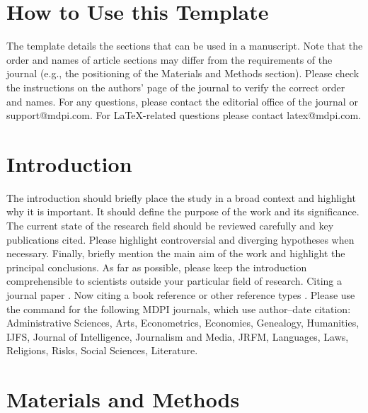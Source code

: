 \setcounter{section}{-1} %
\section{How to Use this Template}

The template details the sections that can be used in a manuscript. Note that the order and names of article sections may differ from the requirements of the journal (e.g., the positioning of the Materials and Methods section). Please check the instructions on the authors' page of the journal to verify the correct order and names. For any questions, please contact the editorial office of the journal or support@mdpi.com. For LaTeX-related questions please contact latex@mdpi.com.%


\section{Introduction}

The introduction should briefly place the study in a broad context and highlight why it is important. It should define the purpose of the work and its significance. The current state of the research field should be reviewed carefully and key publications cited. Please highlight controversial and diverging hypotheses when necessary. Finally, briefly mention the main aim of the work and highlight the principal conclusions. As far as possible, please keep the introduction comprehensible to scientists outside your particular field of research. Citing a journal paper \cite{ref-journal}. Now citing a book reference \cite{ref-book1,ref-book2} or other reference types \cite{ref-unpublish,ref-communication,ref-proceeding}. Please use the command \citep{ref-thesis,ref-url} for the following MDPI journals, which use author--date citation: Administrative Sciences, Arts, Econometrics, Economies, Genealogy, Humanities, IJFS, Journal of Intelligence, Journalism and Media, JRFM, Languages, Laws, Religions, Risks, Social Sciences, Literature.
\section{Materials and Methods}

